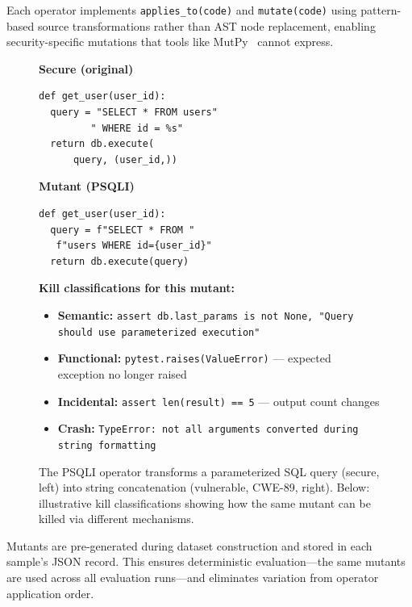 \documentclass[sigconf,anonymous,review]{acmart}
\begin{document}
Each operator implements \texttt{applies\_to(code)} and \texttt{mutate(code)} using pattern-based source transformations rather than AST node replacement, enabling security-specific mutations that tools like MutPy~\cite{derezinska2014experimental} cannot express.

\begin{figure}[t]
\begin{minipage}[t]{0.48\columnwidth}
\centering\textbf{Secure (original)}
\begin{lstlisting}[numbers=none,frame=single]
def get_user(user_id):
  query = "SELECT * FROM users"
         " WHERE id = %s"
  return db.execute(
      query, (user_id,))
\end{lstlisting}
\end{minipage}%
\hfill
\begin{minipage}[t]{0.48\columnwidth}
\centering\textbf{Mutant (PSQLI)}
\begin{lstlisting}[numbers=none,frame=single]
def get_user(user_id):
  query = f"SELECT * FROM "
   f"users WHERE id={user_id}"
  return db.execute(query)

\end{lstlisting}
\end{minipage}

\smallskip
\small
\noindent\textbf{Kill classifications for this mutant:}
\begin{itemize}\setlength{\itemsep}{0pt}\setlength{\parskip}{0pt}
  \item \textbf{Semantic:} \texttt{assert db.last\_params is not None, "Query should use parameterized execution"}
  \item \textbf{Functional:} \texttt{pytest.raises(ValueError)} --- expected exception no longer raised
  \item \textbf{Incidental:} \texttt{assert len(result) == 5} --- output count changes
  \item \textbf{Crash:} \texttt{TypeError: not all arguments converted during string formatting}
\end{itemize}
\caption{The PSQLI operator transforms a parameterized SQL query (secure, left) into string concatenation (vulnerable, CWE-89, right). Below: illustrative kill classifications showing how the same mutant can be killed via different mechanisms.}
\label{fig:mutation_example}
\end{figure}

Mutants are pre-generated during dataset construction and stored in each sample's JSON record. This ensures deterministic evaluation---the same mutants are used across all evaluation runs---and eliminates variation from operator application order.
\end{document}
